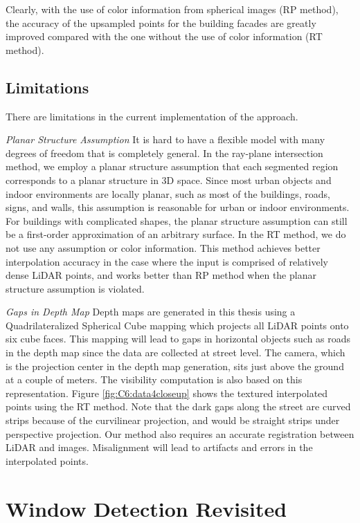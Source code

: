 Clearly, with the use of color information from spherical images (RP method), the accuracy of the upsampled points for the building facades are greatly improved compared with the one without the use of color information (RT method).   

\subsection{Limitations}

There are limitations in the current implementation of the approach.  

{\it Planar Structure Assumption} It is hard to have a flexible model with many degrees of freedom that is completely general. In the ray-plane intersection method, we employ a planar structure assumption that each segmented region corresponds to a planar structure in 3D space. Since most urban objects and indoor environments are locally planar, such as most of the buildings, roads, signs, and walls, this assumption is reasonable for urban or indoor environments. For buildings with complicated shapes, the planar structure assumption can still be a first-order approximation of an arbitrary surface. In the RT method, we do not use any assumption or color information. This method achieves better interpolation accuracy in the case where the input is comprised of relatively dense LiDAR points, and works better than RP method when the planar structure assumption is violated. 

{\it Gaps in Depth Map} Depth maps are generated in this thesis using a Quadrilateralized Spherical Cube mapping which projects all LiDAR points onto six cube faces. This mapping will lead to gaps in horizontal objects such as roads in the depth map since the data are collected at street level. The camera, which is the projection center in the depth map generation, sits just above the ground at a couple of meters. The visibility computation is also based on this representation.  Figure \ref{fig:C6:data4closeup} shows the textured interpolated points using the RT method. Note that the dark gaps along the street are curved strips because of the curvilinear projection, and would be straight strips under perspective projection.
Our method also requires an accurate registration between LiDAR and images. Misalignment will lead to artifacts and errors in the interpolated points. 

\section{Window Detection Revisited}

